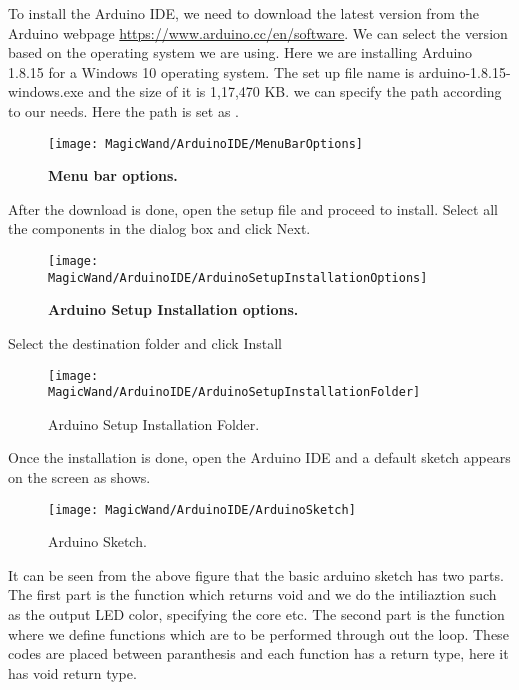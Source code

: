 To install the Arduino IDE, we need to download the latest version from the Arduino webpage \url{https://www.arduino.cc/en/software}. We can select the version based on the operating system we are using. Here we are installing Arduino 1.8.15 for a Windows 10 operating system. 
The set up file name is arduino-1.8.15-windows.exe and the size of it is 1,17,470 KB. we can specify the path according to our needs. Here the path is set as  .

\begin{figure}[H]\centering
    \texttt{[image: MagicWand/ArduinoIDE/MenuBarOptions]}
    \caption{\textbf{Menu bar options.}}
    \label{fig::Menu bar options}		
\end{figure}

After the download is done, open the setup file and proceed to install.
Select all the components in the dialog box and click Next.\\

\begin{figure}[H]\centering
    \texttt{[image: MagicWand/ArduinoIDE/ArduinoSetupInstallationOptions]}
    \caption{\textbf{Arduino Setup Installation options.}}
    \label{fig:Arduino Setup Installation options}		
\end{figure}

Select the destination folder and click Install

\begin{figure}[H]\centering
    \texttt{[image: MagicWand/ArduinoIDE/ArduinoSetupInstallationFolder]}
    \caption{Arduino Setup Installation Folder.}
    \label{fig:Arduino Setup Installation Folder}		
\end{figure}

Once the installation is done, open the Arduino IDE and a default sketch appears on the screen as shows.

\begin{figure}[H]\centering
    \texttt{[image: MagicWand/ArduinoIDE/ArduinoSketch]}
    \caption{Arduino Sketch.}
    \label{fig:Arduino Sketch}		
\end{figure}


It can be seen from the above figure that the basic arduino sketch has two parts. The first part is the function  which returns void and we do the intiliaztion such as the output LED color, specifying the core etc. The second part is the function  where we define functions which are to be performed through out the loop. These codes are placed between paranthesis \PYTHON{$\{ \}$} and each function has a return type, here it has void return type.


